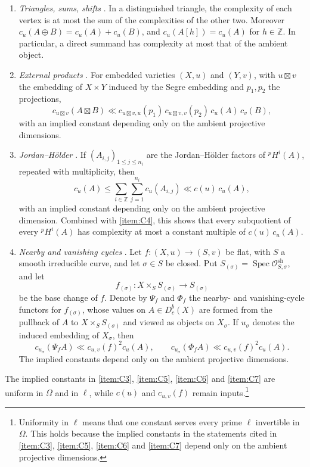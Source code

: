 \documentclass[12pt,reqno]{amsart}
\theoremstyle{definition}
\theoremstyle{plain}
\theoremstyle{definition}
\theoremstyle{remark}
\newcommand{\Db}{D^b_c}
\begin{document}
\begin{enumerate}[label=\textup{(C\arabic*)}, ref=\textup{(C\arabic*)}]
\item\label{item:C4} \emph{Triangles, sums, shifts} \cite[Prop.~6.14]{SFFK23}.  In a distinguished
triangle, the complexity of each vertex is at most the sum of the complexities of the other two.
Moreover \(c_u(A\oplus B)=c_u(A)+c_u(B)\), and \(c_u(A[h])=c_u(A)\) for \(h\in\mathbb Z\).  In
particular, a direct summand has complexity at most that of the ambient object.

\item\label{item:C5} \emph{External products} \cite[Prop.~6.12]{SFFK23}.  For embedded varieties
\((X,u)\) and \((Y,v)\), with \(u\boxtimes v\) the embedding of \(X\times Y\) induced by the Segre
embedding and \(p_1,p_2\) the projections,
\[
        c_{u\boxtimes v}(A\boxtimes B)
        \ll c_{u\boxtimes v,u}(p_1)\,c_{u\boxtimes v,v}(p_2)\,c_u(A)\,c_v(B),
\]
with an implied constant depending only on the ambient projective dimensions.

\item\label{item:C6} \emph{Jordan--H\"older} \cite[Th.~6.15]{SFFK23}.  If
\((A_{i,j})_{1\le j\le n_i}\) are the Jordan--H\"older factors of \({}^pH^i(A)\), repeated with
multiplicity, then
\[
        c_u(A)\le\sum_{i\in\mathbb Z}\sum_{j=1}^{n_i}c_u(A_{i,j})\ll c(u)\,c_u(A),
\]
with an implied constant depending only on the ambient projective dimension.  Combined with
\ref{item:C4}, this shows that every subquotient of every \({}^pH^i(A)\) has complexity at most a
constant multiple of \(c(u)\,c_u(A)\).

\item\label{item:C7} \emph{Nearby and vanishing cycles} \cite[Cor.~6.18]{SFFK23}.  Let
\(f:(X,u)\to(S,v)\) be flat, with \(S\) a smooth irreducible curve, and let \(\sigma\in S\) be closed.
Put \(S_{(\sigma)}=\operatorname{Spec}\mathcal O^{\mathrm{sh}}_{S,\sigma}\), and let
\[
        f_{(\sigma)}:X\times_S S_{(\sigma)}\longrightarrow S_{(\sigma)}
\]
be the base change of \(f\).  Denote by \(\Psi_f\) and \(\Phi_f\) the nearby- and vanishing-cycle
functors for \(f_{(\sigma)}\), whose values on \(A\in\Db(X)\) are formed from the pullback of \(A\) to
\(X\times_S S_{(\sigma)}\) and viewed as objects on \(X_\sigma\).  If \(u_\sigma\) denotes the induced
embedding of \(X_\sigma\), then
\[
        c_{u_\sigma}(\Psi_fA)\ll c_{u,v}(f)^2c_u(A),
        \qquad
        c_{u_\sigma}(\Phi_fA)\ll c_{u,v}(f)^2c_u(A).
\]
The implied constants depend only on the ambient projective dimensions.
\end{enumerate}

The implied constants in \ref{item:C3}, \ref{item:C5}, \ref{item:C6} and \ref{item:C7} are uniform in
\(\Omega\) and in \(\ell\), while \(c(u)\) and \(c_{u,v}(f)\) remain inputs.\footnote{Uniformity in
\(\ell\) means that one constant serves every prime \(\ell\) invertible in \(\Omega\).  This holds
because the implied constants in the statements cited in \ref{item:C3}, \ref{item:C5},
\ref{item:C6} and \ref{item:C7} depend only on the ambient projective dimensions.}
\end{document}
